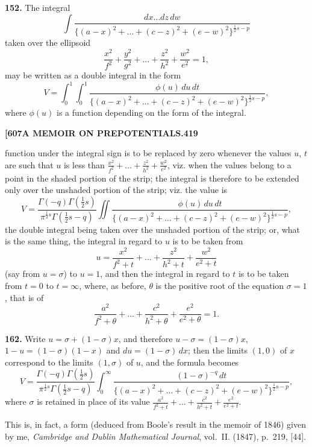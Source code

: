 \documentclass[11pt,a4paper]{article}
\begin{document}
{\medskip
\noindent\textbf{152.}
The integral
\[
\int \frac{dx\ldots dz\, dw}{\{(a-x)^2 + \ldots + (c-z)^2 + (e-w)^2\}^{\frac{1}{2}s-p}}
\]
taken over the ellipsoid
\[
\frac{x^2}{f^2} + \frac{y^2}{g^2} + \ldots + \frac{z^2}{h^2} + \frac{w^2}{e^2} = 1,
\]
may be written as a double integral in the form
\[
V = \int_0^1 \int_0^1 \frac{\phi(u)\, du\, dt}{\{(a-x)^2 + \ldots + (c-z)^2 + (e-w)^2\}^{\frac{1}{2}s-p}},
\]
where $\phi(u)$ is a function depending on the form of the integral.

\newpage
\noindent\textbf{[607}\hspace{\fill}\textbf{A MEMOIR ON PREPOTENTIALS.}\hspace{\fill}\textbf{419}

function under the integral sign is to be replaced by zero whenever the values $u$, $t$ are such that $u$ is less than $\frac{x^2}{f^2} + \ldots + \frac{z^2}{h^2} + \frac{w^2}{e^2}$, viz. when the values belong to a point in the shaded portion of the strip; the integral is therefore to be extended only over the unshaded portion of the strip; viz. the value is
\[
V = \frac{\Gamma(-q)\Gamma(\frac{1}{2}s)}{\pi^{\frac{1}{2}s}\Gamma(\frac{1}{2}s-q)} \iint \frac{\phi(u)\, du\, dt}{\{(a-x)^2 + \ldots + (c-z)^2 + (e-w)^2\}^{\frac{1}{2}s-p}},
\]
the double integral being taken over the unshaded portion of the strip; or, what is the same thing, the integral in regard to $u$ is to be taken from
\[
u = \frac{x^2}{f^2+t} + \ldots + \frac{z^2}{h^2+t} + \frac{w^2}{e^2+t}
\]
(say from $u = \sigma$) to $u = 1$, and then the integral in regard to $t$ is to be taken from $t = 0$ to $t = \infty$, where, as before, $\theta$ is the positive root of the equation $\sigma = 1$, that is of
\[
\frac{a^2}{f^2+\theta} + \ldots + \frac{c^2}{h^2+\theta} + \frac{e^2}{e^2+\theta} = 1.
\]

\medskip
\noindent\textbf{162.}
Write $u = \sigma + (1-\sigma)x$, and therefore $u - \sigma = (1-\sigma)x$, $1 - u = (1-\sigma)(1-x)$ and $du = (1-\sigma)\, dx$; then the limits $(1, 0)$ of $x$ correspond to the limits $(1, \sigma)$ of $u$, and the formula becomes
\[
V = \frac{\Gamma(-q)\Gamma(\frac{1}{2}s)}{\pi^{\frac{1}{2}s}\Gamma(\frac{1}{2}s-q)} \int_0^\infty \frac{(1-\sigma)^{-q}\, dt}{\{(a-x)^2 + \ldots + (c-z)^2 + (e-w)^2\}^{\frac{1}{2}s-p}},
\]
where $\sigma$ is retained in place of its value $\frac{a^2}{f^2+t} + \ldots + \frac{c^2}{h^2+t} + \frac{e^2}{e^2+t}$.

This is, in fact, a form (deduced from Boole's result in the memoir of 1846) given by me, \textit{Cambridge and Dublin Mathematical Journal}, vol.~II. (1847), p.~219, [44].

}
\end{document}
